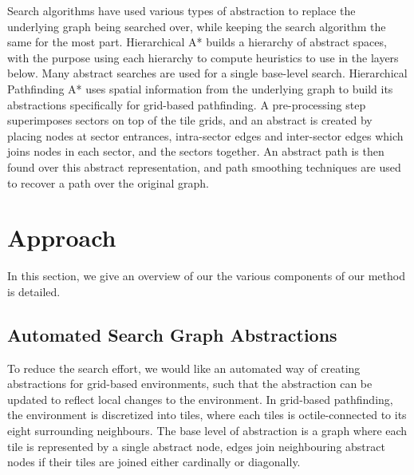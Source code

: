 \documentclass[letterpaper]{article} %
\begin{document}
Search algorithms have used various types of abstraction to replace the underlying graph being searched over,
while keeping the search algorithm the same for the most part.
Hierarchical A* \cite{holte1996hierarchical} builds a hierarchy of abstract spaces,
with the purpose using each hierarchy to compute heuristics to use in the layers below.
Many abstract searches are used for a single base-level search.
Hierarchical Pathfinding A* \cite{botea2004near} uses spatial information from the underlying graph to build its abstractions 
specifically for grid-based pathfinding.
A pre-processing step superimposes sectors on top of the tile grids,
and an abstract is created by placing nodes at sector entrances, intra-sector edges and inter-sector edges
which joins nodes in each sector, and the sectors together.
An abstract path is then found over this abstract representation,
and path smoothing techniques are used to recover a path over the original graph.






\section{Approach}
In this section, we give an overview of our the various components of our method is detailed.

\subsection{Automated Search Graph Abstractions}
To reduce the search effort, we would like an automated way of creating abstractions for grid-based environments,
such that the abstraction can be updated to reflect local changes to the environment.
In grid-based pathfinding, the environment is discretized into tiles,
where each tiles is octile-connected to its eight surrounding neighbours.
The base level of abstraction is a graph where each tile is represented by a single abstract node,
edges join neighbouring abstract nodes if their tiles are joined either cardinally or diagonally.
\end{document}
